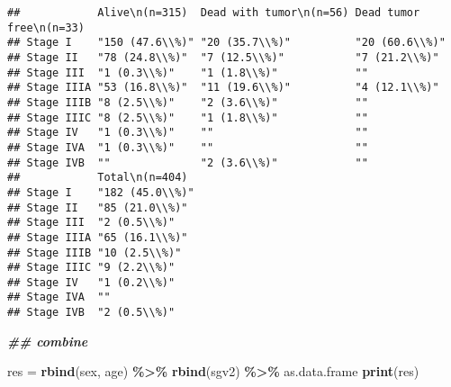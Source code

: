 \documentclass[
]{article}
\newenvironment{Shaded}{\begin{snugshade}}{\end{snugshade}}
\newcommand{\DocumentationTok}[1]{\textcolor[rgb]{0.56,0.35,0.01}{\textbf{\textit{#1}}}}
\newcommand{\FunctionTok}[1]{\textcolor[rgb]{0.13,0.29,0.53}{\textbf{#1}}}
\newcommand{\NormalTok}[1]{#1}
\newcommand{\OtherTok}[1]{\textcolor[rgb]{0.56,0.35,0.01}{#1}}
\newcommand{\SpecialCharTok}[1]{\textcolor[rgb]{0.81,0.36,0.00}{\textbf{#1}}}
\begin{document}
\begin{verbatim}
##            Alive\n(n=315)  Dead with tumor\n(n=56) Dead tumor free\n(n=33)
## Stage I    "150 (47.6\\%)" "20 (35.7\\%)"          "20 (60.6\\%)"         
## Stage II   "78 (24.8\\%)"  "7 (12.5\\%)"           "7 (21.2\\%)"          
## Stage III  "1 (0.3\\%)"    "1 (1.8\\%)"            ""                     
## Stage IIIA "53 (16.8\\%)"  "11 (19.6\\%)"          "4 (12.1\\%)"          
## Stage IIIB "8 (2.5\\%)"    "2 (3.6\\%)"            ""                     
## Stage IIIC "8 (2.5\\%)"    "1 (1.8\\%)"            ""                     
## Stage IV   "1 (0.3\\%)"    ""                      ""                     
## Stage IVA  "1 (0.3\\%)"    ""                      ""                     
## Stage IVB  ""              "2 (3.6\\%)"            ""                     
##            Total\n(n=404) 
## Stage I    "182 (45.0\\%)"
## Stage II   "85 (21.0\\%)" 
## Stage III  "2 (0.5\\%)"   
## Stage IIIA "65 (16.1\\%)" 
## Stage IIIB "10 (2.5\\%)"  
## Stage IIIC "9 (2.2\\%)"   
## Stage IV   "1 (0.2\\%)"   
## Stage IVA  ""             
## Stage IVB  "2 (0.5\\%)"
\end{verbatim}

\begin{Shaded}
\begin{Highlighting}[]
\DocumentationTok{\#\# combine}

\NormalTok{res }\OtherTok{=} \FunctionTok{rbind}\NormalTok{(sex, age) }\SpecialCharTok{\%\textgreater{}\%} \FunctionTok{rbind}\NormalTok{(sgv2) }\SpecialCharTok{\%\textgreater{}\%}\NormalTok{ as.data.frame}
\FunctionTok{print}\NormalTok{(res)}
\end{Highlighting}
\end{Shaded}
\end{document}
